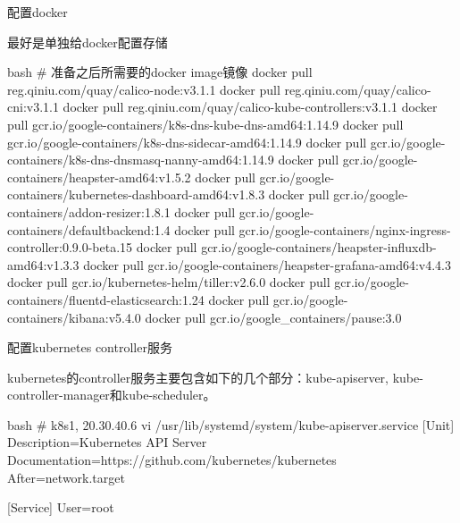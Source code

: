 \begin{outline}[enumerate]
  \1 配置docker

最好是单独给docker配置存储
\begin{code-in-enumerate}{bash}
# 准备之后所需要的docker image镜像
docker pull reg.qiniu.com/quay/calico-node:v3.1.1
docker pull reg.qiniu.com/quay/calico-cni:v3.1.1
docker pull reg.qiniu.com/quay/calico-kube-controllers:v3.1.1
docker pull gcr.io/google-containers/k8s-dns-kube-dns-amd64:1.14.9
docker pull gcr.io/google-containers/k8s-dns-sidecar-amd64:1.14.9
docker pull gcr.io/google-containers/k8s-dns-dnsmasq-nanny-amd64:1.14.9
docker pull gcr.io/google-containers/heapster-amd64:v1.5.2
docker pull gcr.io/google-containers/kubernetes-dashboard-amd64:v1.8.3
docker pull gcr.io/google-containers/addon-resizer:1.8.1
docker pull gcr.io/google-containers/defaultbackend:1.4
docker pull gcr.io/google-containers/nginx-ingress-controller:0.9.0-beta.15
docker pull gcr.io/google-containers/heapster-influxdb-amd64:v1.3.3
docker pull gcr.io/google-containers/heapster-grafana-amd64:v4.4.3
docker pull gcr.io/kubernetes-helm/tiller:v2.6.0
docker pull gcr.io/google-containers/fluentd-elasticsearch:1.24
docker pull gcr.io/google-containers/kibana:v5.4.0
docker pull gcr.io/google_containers/pause:3.0
\end{code-in-enumerate}

  \1 配置kubernetes controller服务

kubernetes的controller服务主要包含如下的几个部分：kube-apiserver, kube-controller-manager和kube-scheduler。
\begin{code-in-enumerate}{bash}
# k8s1, 20.30.40.6
vi /usr/lib/systemd/system/kube-apiserver.service
[Unit]
Description=Kubernetes API Server
Documentation=https://github.com/kubernetes/kubernetes
After=network.target

[Service]
User=root


\end{code-in-enumerate}
\end{outline}
